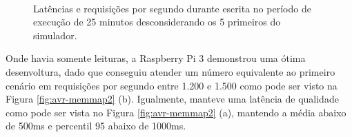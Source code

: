 \documentclass[12pt,english,brazil]{article}
\begin{document}
\begin{figure}[!ht]
  \centering
  \mbox{%
    \qquad
    }
  \caption{Latências e requisições por segundo durante escrita no período de execução de 25 minutos desconsiderando os 5 primeiros do simulador.}
  \label{fig:avr-memmap}
\end{figure}

Onde havia somente leituras, a Raspberry Pi 3 demonstrou uma ótima desenvoltura, dado que conseguiu atender um número equivalente ao primeiro cenário em requisições por segundo entre 1.200 e 1.500 como pode ser visto na Figura \ref{fig:avr-memmap2} (b). Igualmente, manteve uma latência de qualidade como pode ser vista no Figura \ref{fig:avr-memmap2} (a), mantendo a média abaixo de 500ms e percentil 95 abaixo de 1000ms. 
\end{document}
